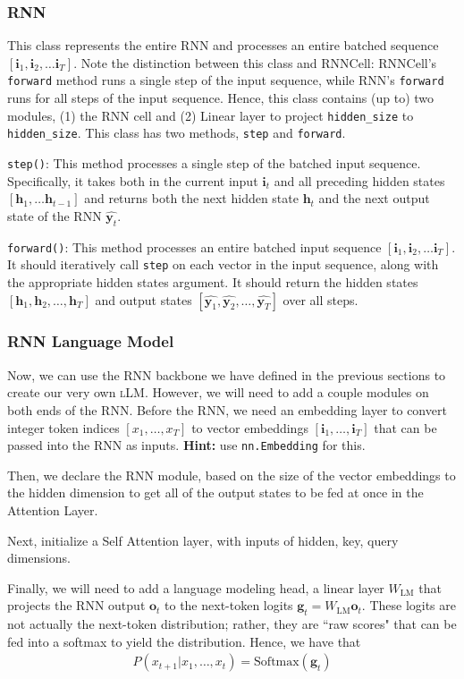 \documentclass[11pt,addpoints,answers]{exam}
\newcommand{\gv}{\mathbf{g}}
\newcommand{\hv}{\mathbf{h}}
\newcommand{\iv}{\mathbf{i}}
\newcommand{\ov}{\mathbf{o}}
\newcommand{\yv}{\mathbf{y}}
\begin{document}
\subsubsection{RNN}

This class represents the entire RNN and processes an entire batched sequence $[\iv_1, \iv_2, \ldots \iv_T]$. Note the distinction between this class and RNNCell: RNNCell's \texttt{forward} method runs a single step of the input sequence, while RNN's \texttt{forward} runs for all steps of the input sequence. Hence, this class contains (up to) two modules, (1) the RNN cell and (2) Linear layer to project \texttt{hidden\_size} to \texttt{hidden\_size}. This class has two methods, \texttt{step} and \texttt{forward}.

\texttt{step()}: This method processes a single step of the batched input sequence. Specifically, it takes both in the current input $\iv_t$ and all preceding hidden states $[\hv_1, \ldots \hv_{t-1}]$ and returns both the next hidden state $\hv_t$ and the next output state of the RNN $\hat{\yv_t}$. 

\texttt{forward()}: This method processes an entire batched input sequence $[\iv_1, \iv_2, \ldots \iv_T]$. It should iteratively call \texttt{step} on each vector in the input sequence, along with the appropriate hidden states argument. It should return the hidden states $[\hv_1, \hv_2, \ldots, \hv_T]$ and output states $[\hat{\yv_1}, \hat{\yv_2}, \ldots, \hat{\yv_T}]$ over all steps.


\subsubsection{RNN Language Model}

Now, we can use the RNN backbone we have defined in the previous sections to create our very own \textsc{l}LM. However, we will need to add a couple modules on both ends of the RNN. Before the RNN, we need an embedding layer to convert integer token indices $[x_1, \ldots, x_T]$ to vector embeddings $[\iv_1, \ldots, \iv_T]$ that can be passed into the RNN as inputs. 
\textbf{Hint:} use \texttt{nn.Embedding} for this. 

Then, we declare the RNN module, based on the size of the vector embeddings to the hidden dimension to get all of the output states to be fed at once in the Attention Layer.

Next, initialize a Self Attention layer, with inputs of hidden, key, query dimensions. 

Finally, we will need to add a language modeling head, a linear layer $W_\text{LM}$ that projects the RNN output $\ov_t$ to the next-token logits $\gv_t = W_\text{LM} \ov_t$. These logits are not actually the next-token distribution; rather, they are ``raw scores" that can be fed into a softmax to yield the distribution. Hence, we have that
\begin{align*}
    P(x_{t+1} | x_1, \ldots, x_t) = \text{Softmax}(\gv_t)
\end{align*}
\end{document}
